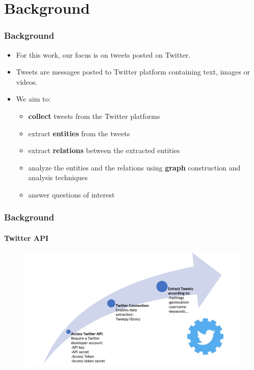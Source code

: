 \documentclass[xcolor=table]{beamer}
\begin{document}
\section{Background}
\begin{frame}
\frametitle{Background}
\begin{itemize}
\item For this work, our focus is on tweets posted on Twitter.
\item Tweets are messages posted to Twitter platform containing text, images or videos.
\item We aim to:
\begin{itemize}
\item \textbf{collect} tweets from the Twitter platforms
\item extract \textbf{entities} from the tweets
\item extract \textbf{relations} between the extracted entities
\item analyze the entities and the relations using \textbf{graph} construction and analysis techniques 
\item answer questions of interest
\end{itemize}
\end{itemize}

\end{frame}

\begin{frame}
\frametitle{Background}
\framesubtitle{Twitter API}
\begin{figure}[!htb]
   \centering
    \includegraphics[scale=0.35]{twitter.png}
    
\end{figure}


\end{frame}
\end{document}
